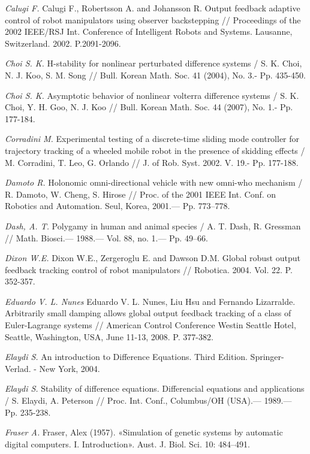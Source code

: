\begin{thebibliography}{10}
	{\it Calugi F.} Calugi F., Robertsson A. and Johansson R. Output feedback adaptive control of robot manipulators using observer backstepping // Proceedings of the 2002 IEEE/RSJ Int. Conference of Intelligent Robots and Systems. Lausanne, Switzerland. 2002. P.2091-2096.
	
	{\it Choi S. K.} H-stability for nonlinear perturbated difference systems / S. K. Choi, N. J. Koo, S. M. Song // Bull. Korean Math. Soc. 41 (2004), No. 3.- Pp. 435-450.
	
	{\it Choi S. K.} Asymptotic behavior of nonlinear volterra difference systems / S. K. Choi, Y. H. Goo, N. J. Koo // Bull. Korean Math. Soc. 44 (2007), No. 1.- Pp. 177-184.
	
	
	{\it Corradini M.} Experimental testing of a discrete-time sliding mode controller for trajectory tracking of a wheeled mobile robot in the presence of skidding effects / M. Corradini, T. Leo, G. Orlando // J. of Rob. Syst. 2002. V. 19.- Pp. 177-188.
	
	{\it Damoto R.} Holonomic omni-directional vehicle with new omni-who mechanism / R. Damoto, W. Cheng, S. Hirose // Proc. of the 2001 IEEE Int. Conf. on Robotics and Automation. Seul, Korea, 2001.— Pp. 773–778.
	
	
	{\it Dash, A. T.} Polygamy in human and animal species / A. T. Dash, R. Gressman // Math. Biosci.— 1988.— Vol. 88, no. 1.— Pp. 49–66.
	
	{\it Dixon W.E.} Dixon W.E., Zergeroglu E. and Dawson D.M. Global robust output feedback tracking control of robot manipulators // Robotica. 2004. Vol. 22. P. 352-357.
	
	{\it Eduardo V. L. Nunes} Eduardo V. L. Nunes, Liu Hsu and Fernando Lizarralde. Arbitrarily small damping allows global output feedback tracking of a class of Euler-Lagrange systems // American Control Conference Westin Seattle Hotel, Seattle, Washington, USA, June 11-13, 2008. P. 377-382.
	
	{\it Elaydi S.} An introduction to Difference Equations. Third Edition. Springer-Verlad. - New York, 2004.
	
	{\it Elaydi S.} Stability of difference equations. Differencial equations and applications / S. Elaydi, A. Peterson // Proc. Int. Conf., Columbus/OH (USA).— 1989.— Pp. 235-238.
	
	{\it Fraser A.} Fraser, Alex (1957). «Simulation of genetic systems by automatic digital computers. I. Introduction». Aust. J. Biol. Sci. 10: 484–491.
	

\end{thebibliography}
